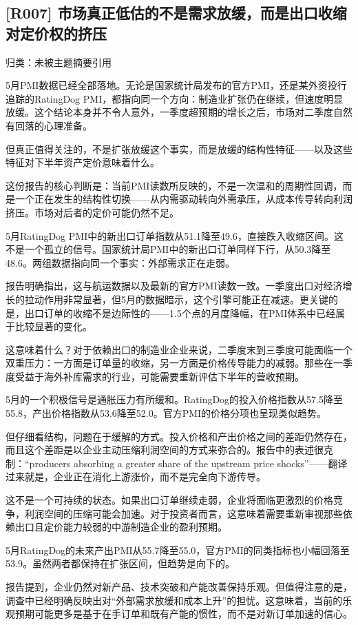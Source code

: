 \documentclass[11pt]{ctexart}
\begin{document}
\subsection{[R007] 市场真正低估的不是需求放缓，而是出口收缩对定价权的挤压}
{\small\color{refgray}归类：未被主题摘要引用}

5月PMI数据已经全部落地。无论是国家统计局发布的官方PMI，还是某外资投行追踪的RatingDog PMI，都指向同一个方向：制造业扩张仍在继续，但速度明显放缓。这个结论本身并不令人意外，一季度超预期的增长之后，市场对二季度自然有回落的心理准备。

但真正值得关注的，不是扩张放缓这个事实，而是放缓的结构性特征——以及这些特征对下半年资产定价意味着什么。

这份报告的核心判断是：当前PMI读数所反映的，不是一次温和的周期性回调，而是一个正在发生的结构性切换——从内需驱动转向外需承压，从成本传导转向利润挤压。市场对后者的定价可能仍然不足。

5月RatingDog PMI中的新出口订单指数从51.1降至49.6，直接跌入收缩区间。这不是一个孤立的信号。国家统计局PMI中的新出口订单同样下行，从50.3降至48.6。两组数据指向同一个事实：外部需求正在走弱。

报告明确指出，这与航运数据以及最新的官方PMI读数一致。一季度出口对经济增长的拉动作用非常显著，但5月的数据暗示，这个引擎可能正在减速。更关键的是，出口订单的收缩不是边际性的——1.5个点的月度降幅，在PMI体系中已经属于比较显著的变化。

这意味着什么？对于依赖出口的制造业企业来说，二季度末到三季度可能面临一个双重压力：一方面是订单量的收缩，另一方面是价格传导能力的减弱。那些在一季度受益于海外补库需求的行业，可能需要重新评估下半年的营收预期。

5月的一个积极信号是通胀压力有所缓和。RatingDog的投入价格指数从57.5降至55.8，产出价格指数从53.6降至52.0。官方PMI的价格分项也呈现类似趋势。

但仔细看结构，问题在于缓解的方式。投入价格和产出价格之间的差距仍然存在，而且这个差距是以企业主动压缩利润空间的方式来弥合的。报告中的表述很克制：“producers absorbing a greater share of the upstream price shocks”——翻译过来就是，企业正在消化上游涨价，而不是完全向下游传导。

这不是一个可持续的状态。如果出口订单继续走弱，企业将面临更激烈的价格竞争，利润空间的压缩可能会加速。对于投资者而言，这意味着需要重新审视那些依赖出口且定价能力较弱的中游制造企业的盈利预期。

5月RatingDog的未来产出PMI从55.7降至55.0，官方PMI的同类指标也小幅回落至53.9。虽然两者都保持在扩张区间，但趋势是向下的。

报告提到，企业仍然对新产品、技术突破和产能改善保持乐观。但值得注意的是，调查中已经明确反映出对“外部需求放缓和成本上升”的担忧。这意味着，当前的乐观预期可能更多是基于在手订单和既有产能的惯性，而不是对新订单加速的信心。
\end{document}
